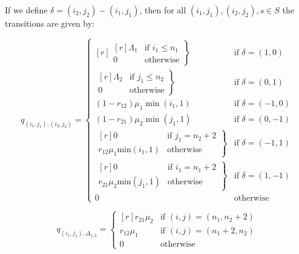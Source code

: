 \documentclass{article}
\begin{document}
If we define $\delta = (i_2, j_2) - (i_1, j_1)$, then for all $(i_1, j_1), (i_2, j_2), s \in S$ the transitions are given by:

\begin{equation}
  q_{(i_1, j_1),(i_2, j_2)} = \left\{
  \begin{matrix*}[ r ]
    \left. \begin{matrix*}[ r ]
      \Lambda_1 & \text{if } i_1 \leq n_1 \\
      0 & \text{otherwise}
    \end{matrix*} \right\} & \text{if } \delta = (1, 0) \\
    \left. \begin{matrix*}[ r ]
      \Lambda_2 & \text{if } j_1 \leq n_2 \\
      0 & \text{otherwise}
    \end{matrix*} \right\} & \text{if } \delta = (0, 1) \\
    (1 - r_{12})\mu_1 \min(i_1, 1) & \text{if } \delta = (-1, 0) \\
    (1 - r_{21})\mu_2 \min(j_1, 1) & \text{if } \delta = (0, -1) \\
    \left. \begin{matrix*}[ r ]
      0 & \text{if } j_1 = n_2 + 2 \\
      r_{12}\mu_1 \text{min}(i_1, 1) & \text{otherwise}
    \end{matrix*} \right\} & \text{if } \delta = (-1, 1) \\
    \left. \begin{matrix*}[ r ]
      0 & \text{if } i_1 = n_1 + 2 \\
      r_{21}\mu_2 \text{min}(j_1, 1) & \text{otherwise}
    \end{matrix*} \right\} & \text{if } \delta = (1, -1) \\
    0 & \text{otherwise}
  \end{matrix*} \right.
\end{equation}

\begin{equation}
  q_{(i_1, j_1), \Delta_{1,2}} = \left\{
  \begin{matrix*}[ r ]
    r_{21}\mu_2 & \text{if } (i, j) = (n_1, n_2 + 2) \\
    r_{12}\mu_1 & \text{if } (i, j) = (n_1 + 2, n_2) \\
    0 & \text{otherwise}
  \end{matrix*}
  \right.
\end{equation}
\end{document}
